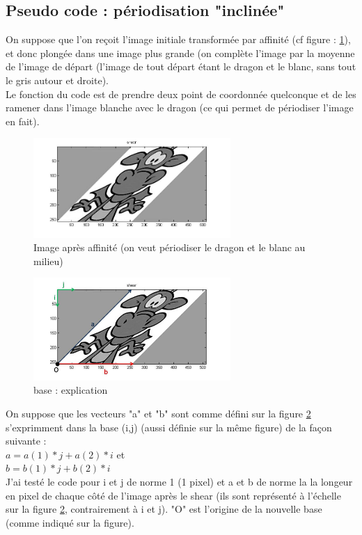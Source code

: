 \documentclass{article}
\newcommand{\sse}[1]{\medbreak \subsection*{#1}}
\begin{document}
\sse{Pseudo code : périodisation "inclinée"}
On suppose que l'on reçoit l'image initiale transformée par affinité (cf figure : \ref{affinit}), et donc plongée dans une image plus grande (on complète l'image par la moyenne de l'image de départ (l'image de tout départ étant le dragon et le blanc, sans tout le gris autour et droite). \\
Le fonction du code est de prendre deux point de coordonnée quelconque et de les ramener dans l'image blanche avec le dragon (ce qui permet de périodiser l'image en fait).\\

\begin{figure}
\begin{center}
\includegraphics[width=75mm]{shear.jpg}
\end{center}
\caption{Image après affinité (on veut périodiser le dragon et le blanc au milieu)}
\label{affinit}
\end{figure}


\begin{figure}
\begin{center}
\includegraphics[width=75mm]{shearexp.jpg}
\end{center}
\caption{base : explication}
\label{affinite}
\end{figure}


On suppose que les vecteurs "a" et "b" sont comme défini sur la figure \ref{affinite} s'exprimment dans la base (i,j) (aussi définie sur la même figure) de la façon suivante : \\
$a=a(1)*j+a(2)*i$ et \\
$b=b(1)*j+b(2)*i$ \\

J'ai testé le code pour i et j de norme 1 (1 pixel) et a et b de norme la la longeur en pixel de chaque côté de l'image après le shear (ils sont représenté à l'échelle sur la figure \ref{affinite}, contrairement à i et j). "O" est l'origine de la nouvelle base (comme indiqué sur la figure).
\end{document}
